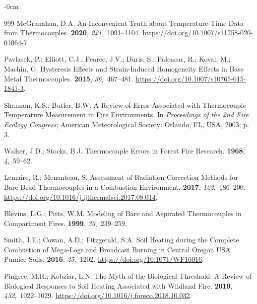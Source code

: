 \documentclass[fire,article,accept,oneauthor,pdftex]{Definitions/mdpi}
\begin{document}
\begin{adjustwidth}{-\extralength}{0cm}
\begin{thebibliography}{999}
McGranahan, D.A.
\newblock An Inconvenient Truth about Temperature-Time Data from Thermocouples.
 {\bf 2020}, {\em 221},~1091--1104.
\newblock
\url{https://doi.org/10.1007/s11258-020-01064-7}.

Pavlasek, P.; Elliott, C.J.; Pearce, J.V.; Duris, S.; Palencar, R.; Koval, M.;
  Machin, G.
\newblock Hysteresis {{Effects}} and {{Strain-Induced Homogeneity Effects}} in
  {{Base Metal Thermocouples}}.
 {\bf 2015}, {\em
  36},~467--481.
\newblock
  \url{https://doi.org/10.1007/s10765-015-1841-3}.

Shannon, K.S.; Butler, B.W.
\newblock A Review of Error Associated with Thermocouple Temperature
  Measurement in Fire Environments.
\newblock  In \emph{Proceedings of the 2nd Fire Ecology Congress}; American
  Meteorological Society: Orlando, FL, USA, 2003; p. 3.


Walker, {\relax J.D}.; Stocks, {\relax B.J}.
\newblock Thermocouple Errors in Forest Fire Research.
 {\bf 1968}, {\em 4},~59--62.

Lemaire, R.; Menanteau, S.
\newblock Assessment of Radiation Correction Methods for Bare Bead
  Thermocouples in a Combustion Environment.
 {\bf 2017}, {\em
  122},~186--200.
\newblock
  \url{https://doi.org/10.1016/j.ijthermalsci.2017.08.014}.

Blevins, L.G.; Pitts, W.M.
\newblock Modeling of Bare and Aspirated Thermocouples in Compartment Fires.
 {\bf 1999}, {\em 33},~239--259.

Smith, J.E.; Cowan, A.D.; Fitzgerald, S.A.
\newblock Soil Heating during the Complete Combustion of Mega-Logs and
  Broadcast Burning in Central {{Oregon USA}} Pumice Soils.
 {\bf 2016}, {\em
  25},~1202.
\newblock
  \url{https://doi.org/10.1071/WF16016}.

Pingree, M.R.; Kobziar, L.N.
\newblock The Myth of the Biological Threshold: {{A}} Review of Biological
  Responses to Soil Heating Associated with Wildland Fire.
 {\bf 2019}, {\em
  432},~1022--1029.
\newblock
  \url{https://doi.org/10.1016/j.foreco.2018.10.032}.


\end{thebibliography}
\end{adjustwidth}
\end{document}
